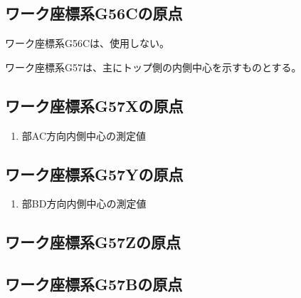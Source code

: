 \subsection{ワーク座標系{\ttfamily G56C}の原点}
ワーク座標系{\ttfamily G56C}は、使用しない。



\clearpage
ワーク座標系{\ttfamily G57}は、主にトップ側の内側中心を示すものとする。


\subsection{ワーク座標系{\ttfamily G57X}の原点}
\begin{enumerate}[label*=\sarrow]
\item \TopEndFace 部AC方向内側中心の測定値
\end{enumerate}


\subsection{ワーク座標系{\ttfamily G57Y}の原点}
\begin{enumerate}[label*=\sarrow]
\item \TopEndFace 部BD方向内側中心の測定値
\end{enumerate}


\subsection{ワーク座標系{\ttfamily G57Z}の原点\TBW}


\subsection{ワーク座標系{\ttfamily G57B}の原点\TBW}


